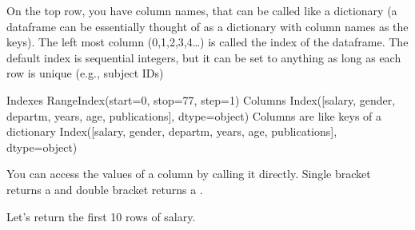 \documentclass[letterpaper,10pt,english]{sphinxmanual}
\begin{document}
On the top row, you have column names, that can be called like a dictionary (a dataframe can be essentially thought of as a dictionary with column names as the keys). The left most column (0,1,2,3,4…) is called the index of the dataframe. The default index is sequential integers, but it can be set to anything as long as each row is unique (e.g., subject IDs)

\begin{sphinxVerbatim}[commandchars=\\\{\}]
\end{sphinxVerbatim}

\begin{sphinxVerbatim}[commandchars=\\\{\}]
Indexes
RangeIndex(start=0, stop=77, step=1)
Columns
Index([\PYGZsq{}salary\PYGZsq{}, \PYGZsq{}gender\PYGZsq{}, \PYGZsq{}departm\PYGZsq{}, \PYGZsq{}years\PYGZsq{}, \PYGZsq{}age\PYGZsq{}, \PYGZsq{}publications\PYGZsq{}], dtype=\PYGZsq{}object\PYGZsq{})
Columns are like keys of a dictionary
Index([\PYGZsq{}salary\PYGZsq{}, \PYGZsq{}gender\PYGZsq{}, \PYGZsq{}departm\PYGZsq{}, \PYGZsq{}years\PYGZsq{}, \PYGZsq{}age\PYGZsq{}, \PYGZsq{}publications\PYGZsq{}], dtype=\PYGZsq{}object\PYGZsq{})
\end{sphinxVerbatim}

You can access the values of a column by calling it directly. Single bracket returns a  and double bracket returns a .

Let’s return the first 10 rows of salary.

\begin{sphinxVerbatim}[commandchars=\\\{\}]
\PYG{p}{[}\PYG{p}{]}\PYG{p}{[}\PYG{p}{]}
\end{sphinxVerbatim}
\end{document}
